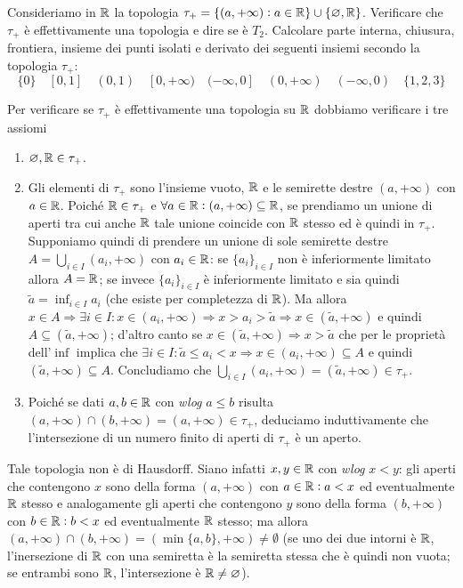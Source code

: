 \begin{es} \label{es:tau_+}
  Consideriamo in $ \mathbb{R} $ la topologia $ \tau_+ = \{(a, +\infty) : a \in \mathbb{R}\} \cup \{\varnothing, \mathbb{R}\} $. Verificare che $ \tau_+ $ è effettivamente una topologia e dire se è $ T_2 $. Calcolare parte interna, chiusura, frontiera, insieme dei punti isolati e derivato dei seguenti insiemi secondo la topologia $ \tau_+ $: \[\{0\} \quad [0, 1] \quad (0, 1) \quad [0, +\infty) \quad (-\infty, 0] \quad (0, +\infty) \quad (-\infty, 0) \quad \{1, 2, 3\}\]
\end{es}
%
Per verificare se $ \tau_+ $ è effettivamente una topologia su $ \mathbb{R} $ dobbiamo verificare i tre assiomi
\begin{enumerate}[label = (\roman*)]
\item $ \varnothing, \mathbb{R} \in \tau_+ $.
\item Gli elementi di $ \tau_+ $ sono l'insieme vuoto, $ \mathbb{R} $ e le semirette destre $ (a, +\infty) $ con $ a \in \mathbb{R} $. Poiché $ \mathbb{R} \in \tau_+ $ e $ \forall a \in \mathbb{R} : (a, +\infty) \subseteq \mathbb{R} $, se prendiamo un unione di aperti tra cui anche $ \mathbb{R} $ tale unione coincide con $ \mathbb{R} $ stesso ed è quindi in $ \tau_+ $. Supponiamo quindi di prendere un unione di sole semirette destre $ A = \bigcup_{i \in I} (a_i, +\infty) $ con $ a_i \in \mathbb{R} $: se $ \{a_i\}_{i \in I} $ non è inferiormente limitato allora $ A = \mathbb{R} $; se invece $ \{a_i\}_{i \in I} $ è inferiormente limitato e sia quindi $ \tilde{a} = \inf_{i \in I} a_i $ (che esiste per completezza di $ \mathbb{R} $). Ma allora $ x \in A \Rightarrow \exists i \in I : x \in (a_i, +\infty) \Rightarrow x > a_i > \tilde{a} \Rightarrow x \in (\tilde{a}, +\infty) $ e quindi $ A \subseteq (\tilde{a}, +\infty) $; d'altro canto se $ x \in (\tilde{a}, +\infty) \Rightarrow x > \tilde{a} $ che per le proprietà dell'$ \inf $ implica che $ \exists i \in I : \tilde{a} \leq a_i < x \Rightarrow x \in (a_i, +\infty) \subseteq A $ e quindi $ (\tilde{a}, +\infty) \subseteq A $. Concludiamo che $ \bigcup_{i \in I} (a_i, +\infty) = (\tilde{a}, +\infty) \in \tau_+ $.
\item Poiché se dati $ a, b \in \mathbb{R} $ con \emph{wlog} $ a \leq b $ risulta $ (a, +\infty) \cap (b, +\infty) = (a, +\infty) \in \tau_+ $, deduciamo induttivamente che l'intersezione di un numero finito di aperti di $ \tau_+ $ è un aperto.
\end{enumerate}
Tale topologia non è di Hausdorff. Siano infatti $ x, y \in \mathbb{R} $ con \emph{wlog} $ x < y $: gli aperti che contengono $ x $ sono della forma $ (a, +\infty) $ con $ a \in \mathbb{R} : a < x $ ed eventualmente $ \mathbb{R} $ stesso e analogamente gli aperti che contengono $ y $ sono della forma $ (b, +\infty) $ con $ b \in \mathbb{R} : b < x $ ed eventualmente $ \mathbb{R} $ stesso; ma allora $ (a, +\infty) \cap (b, +\infty) = (\min\{a, b\}, +\infty) \neq \emptyset $ (se uno dei due intorni è $ \mathbb{R} $, l'inersezione di $ \mathbb{R} $ con una semiretta è la semiretta stessa che è quindi non vuota; se entrambi sono $ \mathbb{R} $, l'intersezione è $ \mathbb{R} \neq \varnothing $). \\
